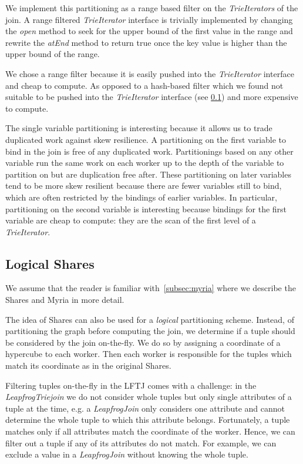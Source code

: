 We implement this partitioning as a range based filter on the \textit{TrieIterators} of the join.
A range filtered \textit{TrieIterator} interface is trivially implemented by changing the \textit{open} method to seek
for the upper bound of the first value in the range and rewrite the \textit{atEnd} method to return true once the key
value is higher than the upper bound of the range.

We chose a range filter because it is easily pushed into the \textit{TrieIterator} interface and cheap to compute.
As opposed to a hash-based filter which we found not suitable to be pushed into the \textit{TrieIterator} interface (see
\cref{subsec:shares-logical}) and more expensive to compute.

The single variable partitioning is interesting because it allows us to trade duplicated work against skew resilience.
A partitioning on the first variable to bind in the join is free of any duplicated work.
Partitionings based on any other variable run the same work on each worker up to the depth of the variable to partition on but
are duplication free after.
These partitioning on later variables tend to be more skew resilient because there are fewer variables still to bind, which are often
restricted by the bindings of earlier variables.
In particular, partitioning on the second variable is interesting because bindings for the first variable are cheap to compute:
they are the scan of the first level of a \textit{TrieIterator}.

\subsection{Logical Shares} \label{subsec:shares-logical}
We assume that the reader is familiar with~\cref{subsec:myria} where we describe the Shares and Myria in more detail.

The idea of Shares can also be used for a \textit{logical} partitioning scheme.
Instead, of partitioning the graph before computing the join, we determine if a tuple should be considered by the
join on-the-fly.
We do so by assigning a coordinate of a hypercube to each worker.
Then each worker is responsible for the tuples which match its coordinate as in the original Shares.

Filtering tuples on-the-fly in the \textsc{LFTJ} comes with a challenge: in the \textit{LeapfrogTriejoin} we do not consider whole tuples
but only single attributes of a tuple at the time,
e.g. a \textit{LeapfrogJoin} only considers one attribute and cannot determine the whole tuple to which this attribute belongs.
Fortunately, a tuple matches only if all attributes match the coordinate of the worker.
Hence, we can filter out a tuple if any of its attributes do not match.
For example, we can exclude a value in a \textit{LeapfrogJoin} without knowing the whole tuple.

